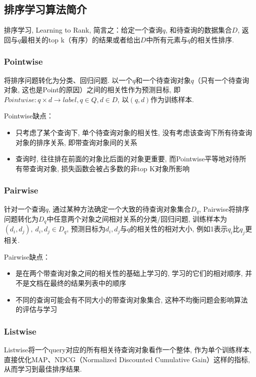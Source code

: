 \subsection{排序学习算法简介}
排序学习, Learning to Rank, 简言之：给定一个查询$q$, 和待查询的数据集合$D$, 返回与$q$最相关的top k（有序）的结果或者给出$D$中所有元素与$q$的相关性排序. 

\subsubsection{Pointwise}
将排序问题转化为分类、回归问题. 以一个$q$和一个待查询对象$q$（只有一个待查询对象, 这也是Point的原因）之间的相关性作为预测目标, 即$Pointwise: q \times d \rightarrow label, q \in Q, d \in D$, 以$(q, d)$作为训练样本. 

Pointwise缺点：
\begin{itemize}
	\item 只考虑了某个查询下, 单个待查询对象的相关性, 没有考虑该查询下所有待查询对象的排序关系, 即带查询对象间的关系
	\item 查询时, 往往排在前面的对象比后面的对象更重要, 而Pointwise平等地对待所有带查询对象, 损失函数会被占多数的非top K对象所影响
\end{itemize}


\subsubsection{Pairwise}
针对一个查询$q$, 通过某种方法确定一个大致的待查询对象集合$D_q$, Pairwise将排序问题转化为$D_q$中任意两个对象之间相对关系的分类/回归问题, 训练样本为$(d_i, d_j),\: d_i, d_j \in D_q$, 预测目标为$d_i, d_j$与$q$的相关性的相对大小, 例如1表示$q_i$比$q_j$更相关. 

Pairwise缺点：
\begin{itemize}
	\item 是在两个带查询对象之间的相关性的基础上学习的, 学习的它们的相对顺序, 并不是文档在最终的结果列表中的顺序
	\item 不同的查询可能会有不同大小的带查询对象集合, 这种不均衡问题会影响算法的评估与学习
\end{itemize}


\subsubsection{Listwise}
Listwise将一个query对应的所有相关待查询对象看作一个整体, 作为单个训练样本, 直接优化MAP、NDCG（Normalized Discounted Cumulative Gain）这样的指标, 从而学习到最佳排序结果. 